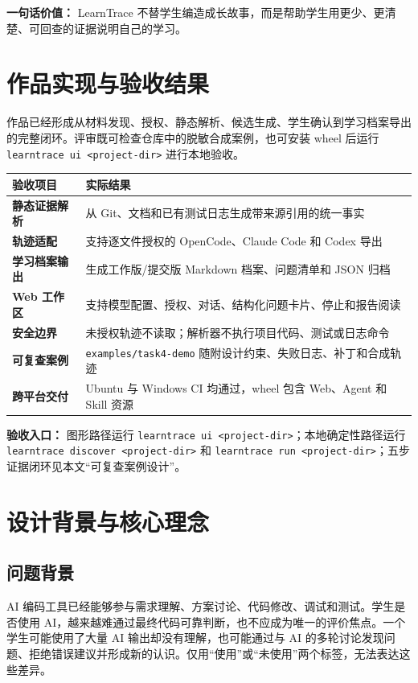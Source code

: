 \documentclass[UTF8,a4paper,12pt]{ctexart}
\begin{document}
\noindent\textbf{一句话价值：} LearnTrace 不替学生编造成长故事，而是帮助学生用更少、更清楚、可回查的证据说明自己的学习。

\section{作品实现与验收结果}

作品已经形成从材料发现、授权、静态解析、候选生成、学生确认到学习档案导出的完整闭环。评审既可检查仓库中的脱敏合成案例，也可安装 wheel 后运行 \texttt{learntrace ui <project-dir>} 进行本地验收。

\begin{center}
\small
\begin{tabularx}{\textwidth}{>{\bfseries}p{}X}
\toprule
验收项目 & 实际结果 \\
\midrule
静态证据解析 & 从 Git、文档和已有测试日志生成带来源引用的统一事实 \\
轨迹适配 & 支持逐文件授权的 OpenCode、Claude Code 和 Codex 导出 \\
学习档案输出 & 生成工作版/提交版 Markdown 档案、问题清单和 JSON 归档 \\
Web 工作区 & 支持模型配置、授权、对话、结构化问题卡片、停止和报告阅读 \\
安全边界 & 未授权轨迹不读取；解析器不执行项目代码、测试或日志命令 \\
可复查案例 & \texttt{examples/task4-demo} 随附设计约束、失败日志、补丁和合成轨迹 \\
跨平台交付 & Ubuntu 与 Windows CI 均通过，wheel 包含 Web、Agent 和 Skill 资源 \\
\bottomrule
\end{tabularx}
\end{center}

\noindent\textbf{验收入口：} 图形路径运行 \texttt{learntrace ui <project-dir>}；本地确定性路径运行 \texttt{learntrace discover <project-dir>} 和 \texttt{learntrace run <project-dir>}；五步证据闭环见本文“可复查案例设计”。

\clearpage

\section{设计背景与核心理念}

\subsection{问题背景}

AI 编码工具已经能够参与需求理解、方案讨论、代码修改、调试和测试。学生是否使用 AI，越来越难通过最终代码可靠判断，也不应成为唯一的评价焦点。一个学生可能使用了大量 AI 输出却没有理解，也可能通过与 AI 的多轮讨论发现问题、拒绝错误建议并形成新的认识。仅用“使用”或“未使用”两个标签，无法表达这些差异。
\end{document}
